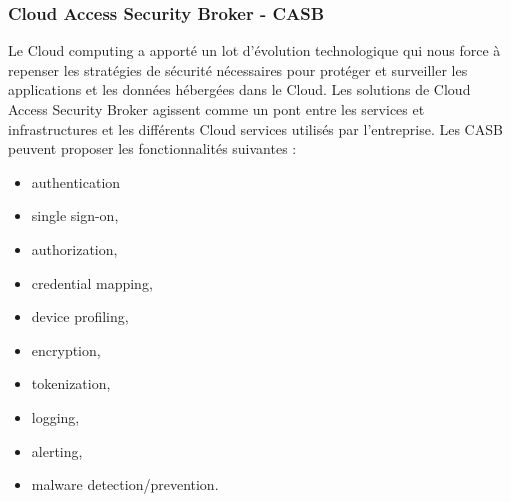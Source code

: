 
\subsubsection{Cloud Access Security Broker - CASB}
Le Cloud computing a apporté un lot d'évolution technologique qui nous force à repenser les stratégies de sécurité nécessaires pour protéger et surveiller les applications et les données hébergées dans le Cloud.
Les solutions de Cloud Access Security Broker agissent comme un pont entre les services et infrastructures  et les différents Cloud services utilisés par l'entreprise.
Les CASB peuvent proposer les fonctionnalités suivantes : 
\begin{itemize}
    \item authentication
    \item single sign-on, 
   \item  authorization, 
   \item  credential mapping, 
    \item device profiling, 
    \item encryption, 
    \item tokenization, 
   \item  logging, 
    \item alerting, 
    \item malware detection/prevention.
\end{itemize}

